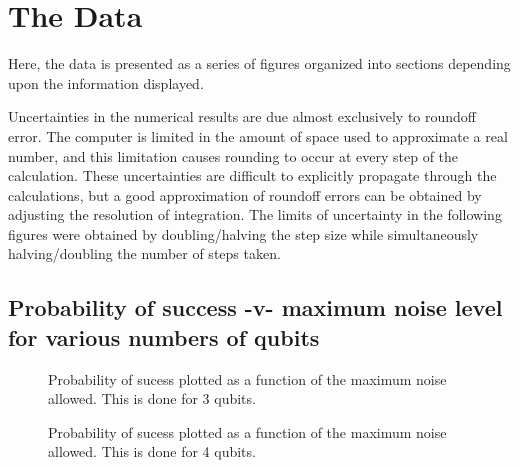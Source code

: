 \chapter{The Data}
\label{chap:data}
%

\newlength{\dataheight}
\setlength{\dataheight}{4in}
\newlength{\datawidth}
\setlength{\datawidth}{4.5in}

Here, the data is presented as a series of figures organized
into sections depending upon the information displayed.

Uncertainties in the numerical results are due almost exclusively
to roundoff error.  The computer is limited in the amount of space
used to approximate a real number, and this limitation causes rounding
to occur at every step of the calculation.  These uncertainties
are difficult to explicitly propagate through the calculations, but
a good approximation of roundoff errors can be obtained by adjusting
the resolution of integration.  The limits of uncertainty in the
following figures were obtained by doubling/halving the step size
while simultaneously halving/doubling the number of steps taken.

\pagebreak

\section{Probability of success -v- maximum noise level for various
numbers of qubits}



%
\begin{figure}[h]
\begin{center}
\end{center}
\caption{Probability of sucess plotted as a function of the maximum noise allowed.
This is done for 3 qubits.}
\end{figure}

\pagebreak

\begin{figure}[h]
\begin{center}
\end{center}
\caption{Probability of sucess plotted as a function of the maximum noise allowed.
This is done for 4 qubits.}
\end{figure}

